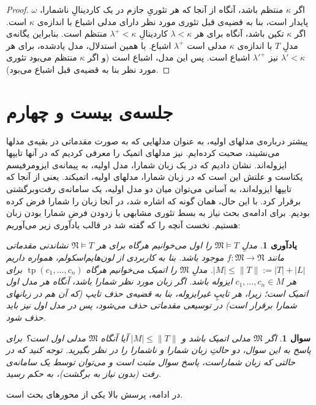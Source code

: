 \documentclass[12pt,a4paper]{report}
\theoremstyle{colorhead}
\newtheorem{yad}[thm]{یادآوری}
\newtheorem{soal}[thm]{سوال}
\DeclareMathOperator{\tp}{tp}
\begin{document}
\begin{proof}
	اگر
	$\kappa$
	منتظم باشد، آنگاه از آنجا که هر تئوریِ جازم در یک کاردینالِ ناشمارا،
	$\omega$	پایدار 
	است، بنا به قضیه‌ی قبل تئوری مورد نظر دارای مدلی اشباع با اندازه‌ی
	$\kappa$
	است. اگر
	$\kappa$
	تکین 
	باشد، آنگاه برای هر 
	$\lambda<\kappa$
	کاردینالِ
	$\lambda^+<\kappa$
	منتظم است.  بنابراین یگانه‌ی مدلِ
	$T$
	با اندازه‌ی
	$\kappa$
	مدلی است 
	$\lambda^+$
	اشباع. با همین استدلال، مدل یادشده، برای هر
	$\lambda'<\kappa$
نیز
$\lambda'^+$
اشباع است. 
پس این مدل، اشباع است (و اگر
$\kappa$
منتظم می‌بود تئوری مورد نظر بنا به قضیه‌ی قبل اشباع می‌بود).
	\end{proof}
\pagebreak
\section{جلسه‌ی بیست و چهارم}
پیشتر درباره‌ی مدلهای اولیه، به عنوان مدلهایی که به صورت مقدماتی در بقیه‌ی مدلها می‌نشیند، صحبت کرده‌ایم. 
نیز مدلهای اتمیک را معرفی کردیم که در آنها تایپها ایزوله‌اند.  نشان دادیم که در یک زبان شمارا، مدل اولیه، به پیمانه‌ی
ایزومرفیسم یکتاست و علتش این است که در زبان شمارا، مدلهای اولیه، اتمیکند. یعنی از آنجا که تایپها ایزوله‌اند، به آسانی 
می‌توان میان دو مدل اولیه، یک سامانه‌ی رفت‌‌وبرگشتی برقرار کرد. با این حال، همان گونه که اشاره شد، 
در آنجا زبان را شمارا فرض کرده‌ بودیم. 
برای ادامه‌ی بحث نیاز به بسط تئوری مشابهی با زدودن فرضِ شمارا بودن زبان هستیم.
 نخست آنچه را که گفته شد
در قالب یادآوری زیر می‌آوریم:
\begin{yad}
	مدلِ
	$\mathfrak{M}\models T$
	را اول می‌خوانیم هرگاه  برای هر
	$\mathfrak{N}\models T$
	نشاندنی مقدماتی مانند
	$f:\mathfrak{M}\to \mathfrak{N}$
	موجود باشد. بنا به کاربردی از لون‌هایم‌اسکولم، همواره داریم
	\mbox{$|M|\leq \|T\|:=|T|+|L|$}.
	مدلِ
	$\mathfrak{M}$
	را اتمیک می‌خوانیم هرگاه
	$\tp(c_1,\ldots,c_n)$
	برای هر
	$c_1,\ldots,c_n\in M$
ایزوله باشد. اگر زبان مورد نظر شمارا باشد، آنگاه هر مدل اول اتمیک است؛ زیرا، هر تایپِ غیرایزوله، بنا به قضیه‌ی حذف تایپ (که آن هم در زبانهای شمارا برقرار است) در توسیعی مقدماتی حذف می‌شود، پس در مدل اول نیز باید حذف شود.	
	\end{yad}
\begin{soal}
	اگر
	$\mathfrak{M}$
	مدلی اتمیک باشد و 
	$|M|\leq \|T\|$
	آیا آنگاه
	$\mathfrak{M}$
	مدلی اول است؟ برای پاسخ به این سوال، دو حالتِ زبان شمارا و ناشمارا را در نظر بگیرید. توجه کنید که
	در حالتی که زبان شماراست، پاسخ سوال مثبت است و می‌توان توسط یک سامانه‌ی رفت (بدون نیاز به برگشت)، به حکم رسید.
	\end{soal}
در ادامه، پرسش بالا یکی از محورهای بحث است. 
\end{document}
